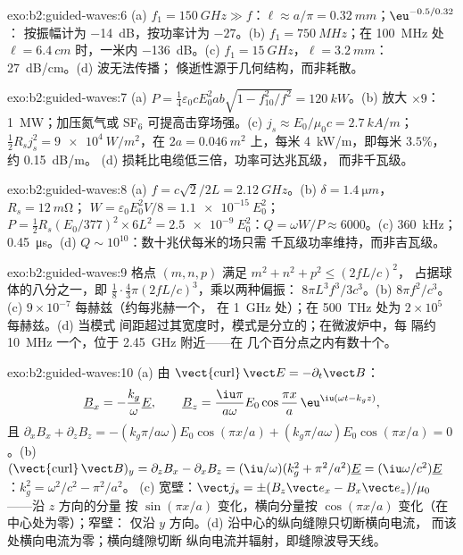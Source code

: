 \begin{solution}{exo:b2:guided-waves:6}
(a) $f_1 = \qty{150}{GHz} \gg f$：$\ell \approx a/\pi = \qty{0.32}{mm}$；$\eu^{-0.5/0.32}$：
按振幅计为 \qty{-14}{dB}，按功率计为 $-27$。(b) $f_1 = \qty{750}{MHz}$；在 \qty{100}{MHz} 处
$\ell = \qty{6.4}{cm}$ 时，一米内 \qty{-136}{dB}。(c) $f_1 = \qty{15}{GHz}$，$\ell =
\qty{3.2}{mm}$：\qty{27}{dB/cm}。(d) 波无法传播；
倏逝性源于几何结构，而非耗散。
\end{solution}

\begin{solution}{exo:b2:guided-waves:7}
(a) $P = \tfrac14\varepsilon_0cE_0^2ab\sqrt{1 - f_{10}^2/f^2} = \qty{120}{kW}$。(b) 放大 $\times9$：
\qty{1}{MW}；加压氮气或 SF$_6$ 可提高击穿场强。(c)
$j_s \approx E_0/\mu_0c = \qty{2.7}{kA/m}$；$\tfrac12R_sj_s^2 = \qty{9e4}{W/m^2}$，在 $2a =
\qty{0.046}{m^2}$ 上，每米 \qty{4}{kW/m}，即每米 $3.5\%$，约 \qty{0.15}{dB/m}。
(d) 损耗比电缆低三倍，功率可达兆瓦级，
而非千瓦级。
\end{solution}

\begin{solution}{exo:b2:guided-waves:8}
(a) $f = c\sqrt2/2L = \qty{2.12}{GHz}$。(b) $\delta = \qty{1.4}{\micro m}$，$R_s = \qty{12}{m\ohm}$；
$W = \varepsilon_0E_0^2V/8 = \qty{1.1e-15}{}E_0^2$；$P = \tfrac12R_s(E_0/377)^2 \times 6L^2 =
\qty{2.5e-9}{}E_0^2$：$Q = \omega W/P \approx 6000$。(c) \qty{360}{kHz}；\qty{0.45}{\micro s}。(d)
$Q \sim 10^{10}$：数十兆伏每米的场只需
千瓦级功率维持，而非吉瓦级。
\end{solution}

\begin{solution}{exo:b2:guided-waves:9}
格点 $(m, n, p)$ 满足 $m^2 + n^2 + p^2 \le (2fL/c)^2$，
占据球体的八分之一，即 $\tfrac18\cdot\tfrac43\pi(2fL/c)^3$，乘以两种偏振：
$8\pi L^3f^3/3c^3$。(b) $8\pi f^2/c^3$。(c) $9 \times 10^{-7}$ 每赫兹（约每兆赫一个，
在 \qty{1}{GHz} 处）；在 \qty{500}{THz} 处为 $2 \times 10^5$ 每赫兹。(d) 当模式
间距超过其宽度时，模式是分立的；在微波炉中，每
隔约 \qty{10}{MHz} 一个，位于 \qty{2.45}{GHz} 附近——在
几个百分点之内有数十个。
\end{solution}

\begin{solution}{exo:b2:guided-waves:10}
(a) 由 $\operatorname{\vect{curl}}\vect E = -\partial_t\vect B$：
\[
\underline B_x = -\frac{k_g}\omega\underline E , \qquad
\underline B_z = \frac{\iu\pi}{a\omega}E_0\cos\frac{\pi x}a\,\eu^{\iu(\omega t - k_gz)} ,
\]
且 $\partial_xB_x + \partial_zB_z = -(k_g\pi/a\omega)E_0\cos(\pi x/a) + (k_g\pi/a\omega)E_0
\cos(\pi x/a) = 0$。(b) $(\operatorname{\vect{curl}}\vect B)_y = \partial_zB_x - \partial_xB_z =
(\iu/\omega)(k_g^2 + \pi^2/a^2)\underline E = (\iu\omega/c^2)\underline E$：$k_g^2 = \omega^2/c^2 - \pi^2/a^2$。
(c) 宽壁：$\vect j_s = \pm(B_z\vect e_x - B_x\vect e_z)/\mu_0$——沿 $z$ 方向的分量
按 $\sin(\pi x/a)$ 变化，横向分量按 $\cos(\pi x/a)$ 变化（在中心处为零）；窄壁：
仅沿 $y$ 方向。(d) 沿中心的纵向缝隙只切断横向电流，
而该处横向电流为零；横向缝隙切断
纵向电流并辐射，即缝隙波导天线。
\end{solution}

